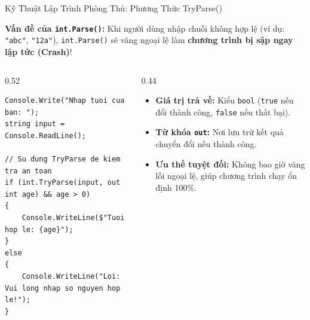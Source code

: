 \documentclass[aspectratio=169, 10pt]{beamer}
\begin{document}
\begin{frame}[fragile]{Kỹ Thuật Lập Trình Phòng Thủ: Phương Thức TryParse()}
  \begin{alertblock}{\textbf{Vấn đề của \texttt{int.Parse()}:}}
    Khi người dùng nhập chuỗi không hợp lệ (ví dụ: \texttt{"abc"}, \texttt{"12a"}), \texttt{int.Parse()} sẽ văng ngoại lệ làm \textbf{chương trình bị sập ngay lập tức (Crash)}!
  \end{alertblock}

  \begin{columns}[T]
    \begin{column}{0.52\textwidth}
      \begin{tcolorbox}[colback=UniGreen!10,colframe=UniGreen,title=\textbf{Giải pháp phòng thủ chuẩn mực: \texttt{int.TryParse()}},fonttitle=\small\bfseries]
\begin{lstlisting}[numbers=none]
Console.Write("Nhap tuoi cua ban: ");
string input = Console.ReadLine();

// Su dung TryParse de kiem tra an toan
if (int.TryParse(input, out int age) && age > 0)
{
    Console.WriteLine($"Tuoi hop le: {age}");
}
else
{
    Console.WriteLine("Loi: Vui long nhap so nguyen hop le!");
}
\end{lstlisting}
      \end{tcolorbox}
    \end{column}

    \begin{column}{0.44\textwidth}
      \begin{tcolorbox}[colback=UniLightBlue!30,colframe=UniBlue,title=\textbf{Giải mã cú pháp \texttt{TryParse}},fonttitle=\small\bfseries]
        \begin{itemize}\small
          \item \textbf{Giá trị trả về:} Kiểu \texttt{bool} (\texttt{true} nếu đổi thành công, \texttt{false} nếu thất bại).
          \item \textbf{Từ khóa \texttt{out}:} Nơi lưu trữ kết quả chuyển đổi nếu thành công.
          \item \textbf{Ưu thế tuyệt đối:} Không bao giờ văng lỗi ngoại lệ, giúp chương trình chạy ổn định 100\%.
        \end{itemize}
      \end{tcolorbox}
    \end{column}
  \end{columns}
\end{frame}
\end{document}
